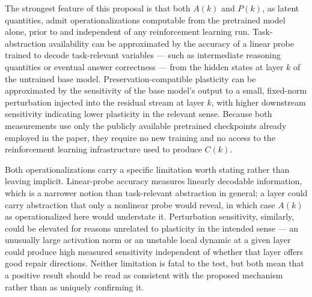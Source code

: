 \documentclass[11pt]{article}
\begin{document}
The strongest feature of this proposal is that both $A(k)$ and $P(k)$, as latent quantities, admit operationalizations computable from the pretrained model alone, prior to and independent of any reinforcement learning run. Task-abstraction availability can be approximated by the accuracy of a linear probe trained to decode task-relevant variables --- such as intermediate reasoning quantities or eventual answer correctness --- from the hidden states at layer $k$ of the untrained base model. Preservation-compatible plasticity can be approximated by the sensitivity of the base model's output to a small, fixed-norm perturbation injected into the residual stream at layer $k$, with higher downstream sensitivity indicating lower plasticity in the relevant sense. Because both measurements use only the publicly available pretrained checkpoints already employed in the paper, they require no new training and no access to the reinforcement learning infrastructure used to produce $C(k)$.

Both operationalizations carry a specific limitation worth stating rather than leaving implicit. Linear-probe accuracy measures linearly decodable information, which is a narrower notion than task-relevant abstraction in general; a layer could carry abstraction that only a nonlinear probe would reveal, in which case $A(k)$ as operationalized here would understate it. Perturbation sensitivity, similarly, could be elevated for reasons unrelated to plasticity in the intended sense --- an unusually large activation norm or an unstable local dynamic at a given layer could produce high measured sensitivity independent of whether that layer offers good repair directions. Neither limitation is fatal to the test, but both mean that a positive result should be read as consistent with the proposed mechanism rather than as uniquely confirming it.
\end{document}
